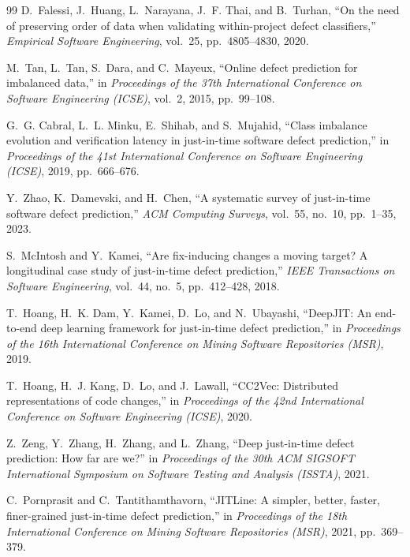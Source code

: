 \documentclass[12pt,a4paper,oneside]{report}
\begin{document}
{\begin{thebibliography}{99}
D.~Falessi, J.~Huang, L.~Narayana, J.~F. Thai, and B.~Turhan, ``On the need of
preserving order of data when validating within-project defect classifiers,''
\emph{Empirical Software Engineering}, vol.~25, pp.~4805--4830, 2020.

M.~Tan, L.~Tan, S.~Dara, and C.~Mayeux, ``Online defect prediction for
imbalanced data,'' in \emph{Proceedings of the 37th International Conference on
Software Engineering (ICSE)}, vol.~2, 2015, pp.~99--108.

G.~G. Cabral, L.~L. Minku, E.~Shihab, and S.~Mujahid, ``Class imbalance
evolution and verification latency in just-in-time software defect
prediction,'' in \emph{Proceedings of the 41st International Conference on
Software Engineering (ICSE)}, 2019, pp.~666--676.

Y.~Zhao, K.~Damevski, and H.~Chen, ``A systematic survey of just-in-time
software defect prediction,'' \emph{ACM Computing Surveys}, vol.~55, no.~10,
pp.~1--35, 2023.

S.~McIntosh and Y.~Kamei, ``Are fix-inducing changes a moving target? A
longitudinal case study of just-in-time defect prediction,'' \emph{IEEE
Transactions on Software Engineering}, vol.~44, no.~5, pp.~412--428, 2018.

T.~Hoang, H.~K. Dam, Y.~Kamei, D.~Lo, and N.~Ubayashi, ``DeepJIT: An end-to-end
deep learning framework for just-in-time defect prediction,'' in
\emph{Proceedings of the 16th International Conference on Mining Software
Repositories (MSR)}, 2019.

T.~Hoang, H.~J. Kang, D.~Lo, and J.~Lawall, ``CC2Vec: Distributed
representations of code changes,'' in \emph{Proceedings of the 42nd
International Conference on Software Engineering (ICSE)}, 2020.

Z.~Zeng, Y.~Zhang, H.~Zhang, and L.~Zhang, ``Deep just-in-time defect
prediction: How far are we?'' in \emph{Proceedings of the 30th ACM SIGSOFT
International Symposium on Software Testing and Analysis (ISSTA)}, 2021.

C.~Pornprasit and C.~Tantithamthavorn, ``JITLine: A simpler, better, faster,
finer-grained just-in-time defect prediction,'' in \emph{Proceedings of the
18th International Conference on Mining Software Repositories (MSR)}, 2021,
pp.~369--379.


\end{thebibliography}}
\end{document}

